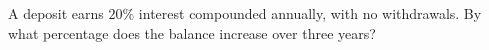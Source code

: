 A deposit earns $20\%$ interest compounded annually, with no withdrawals. By what percentage does the balance increase over three years?
